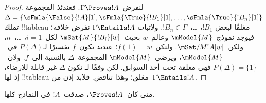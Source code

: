 \documentclass[../../../include/open-logic-section]{subfiles}
\begin{document}
\begin{proof}
  لنفرض~$\Gamma \Proves !A$. فعندئذ المجموعة
  $\Delta = \{\sFmla{\False}{!A}[1], \sFmla{\True}{!B_1}[1],
  \dots, \sFmla{\True}{!B_n}[1]\}$ تملك !!{tableau} مغلقًا لبعض
  $!B_1$، \dots،~$!B_n \in \Gamma$. ولإثبات
  $\Gamma \Entails !A$ نفرض خلافه؛ فيوجد نموذج~$\mModel{M}$
  وعالم~$w$ بحيث~$\mSat{M}{!B_i}[w]$ لكل~$i=1$، \dots،~$n$،
  ولكن~$\mSat/{M}{!A}[w]$. ولتكن~$f(1) = w$؛ عندئذ تكون~$f$ تفسيرًا
  لـ$P(\Delta)$ في~$\mModel{M}$، ويرضي~$\mModel{M}$ المجموعة~$\Delta$
  بالنسبة إلى~$f$. ولأن~$P(\Delta)=\{1\}$ فهي مغلقة تحت أخذ السوابق.
  لكن وفقًا لـ تكون
  $\Delta$ غير قابلة للإرضاء، إذ لها !!{tableau} مغلق؛ وهذا تناقض.
  فلابد إذن من~$\Gamma \Entails !A$.
\end{proof}

\begin{cor}
متى كان~$\Proves !A$، صدقت~$!A$ في النماذج كلها.
\end{cor}
\end{document}
